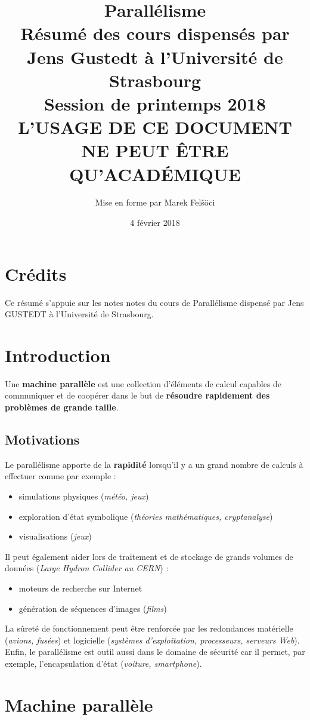 \documentclass[12pt, a4paper]{article}
\title{
  \textbf{Parallélisme} \\
  \Large Résumé des cours dispensés par Jens Gustedt à l'Université de
  Strasbourg \\
  \large Session de printemps 2018 \\
  \huge L'USAGE DE CE DOCUMENT NE PEUT ÊTRE QU'ACADÉMIQUE
}
\author{Mise en forme par Marek Felšöci}
\date{4 février 2018}
\begin{document}
  \maketitle
  \section*{Crédits}
    Ce résumé s'appuie sur les notes notes du cours de Parallélisme dispensé par
    Jens GUSTEDT à l'Université de Strasbourg.
  \section{Introduction}
    Une \textbf{machine parallèle} est une collection d'éléments de calcul
    capables de communiquer et de coopérer dans le but de \textbf{résoudre
    rapidement des problèmes de grande taille}.
    \subsection{Motivations}
      Le parallélisme apporte de la \textbf{rapidité} lorsqu'il y a un grand
      nombre de calculs à effectuer comme par exemple :
      \begin{itemize}
        \item simulations physiques (\textit{météo, jeux})
        \item exploration d'état symbolique (\textit{théories mathématiques,
        cryptanalyse})
        \item visualisations (\textit{jeux})
      \end{itemize}
      Il peut également aider lors de traitement et de stockage de grands
      volumes de données (\textit{Large Hydron Collider au CERN}) :
      \begin{itemize}
        \item moteurs de recherche sur Internet
        \item génération de séquences d'images (\textit{films})
      \end{itemize}
      La sûreté de fonctionnement peut être renforcée par les redondances
      matérielle (\textit{avions, fusées}) et logicielle (\textit{systèmes
      d'exploitation, processeurs, serveurs Web}). Enfin, le parallélisme est
      outil aussi dans le domaine de sécurité car il permet, par exemple,
      l'encapsulation d'état (\textit{voiture, smartphone}).
  \section{Machine parallèle}
\end{document}
